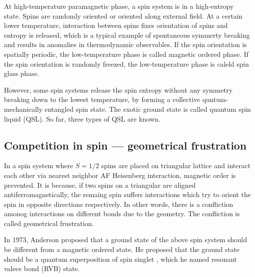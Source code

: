 At high-temperature paramagnetic phase, a spin system is in a high-entropy state.
Spins are randomly oriented or oriented along external field.
At a certain lower temperature, interaction between spins fixes orientation of spins and entropy is released, which is a typical example of spontaneous symmerty breaking and results in anomalies in thermodynamic observables.
If the spin orientation is spatially periodic, the low-temperature phase is called magnetic ordered phase.
If the spin orientation is randomly freezed, the low-temperature phase is caleld spin glass phase.

However, some spin systems release the spin entropy without any symmetry breaking down to the lowest temperature, by forming a collective quntum-mechanically entangled spin state.
The exotic ground state is called quantum spin liquid (QSL).
So far, three types of QSL are known.

\begin{comment}
\subsection{One-dimensional $S = 1/2$ Heisenberg spin chain}

Quantum spin liquid has an unusual elementary excitation called fractional excitation.

The concept of fractional excitaion is wider than quantum spin liquid.
It also appears in itinerant electron system, for example, spin-charge separation in Tomonaga-Luttinger liquid (one-dimensional Hubbard model) and $e/3$ excitation in two-dimensional fractional quantum Hall liquid (Table \textcolor{red}{make table}).
\end{comment}
\subsection{Competition in spin --- geometrical frustration}
In a spin system where $S = 1/2$ spins are placed on triangular lattice and interact each other via nearest neighbor AF Heisenberg interaction, magnetic order is prevented.
It is because, if two spins on a triangular are aligned antiferromagnetically, the remaing spin suffers interactions which try to orient the spin in opposite directions respectively.
In other words, there is a confliction amonog interactions on different bonds due to the geometry.
The confliction is called geometrical frustration.

In 1973, Anderson proposed that a ground state of the above spin system should be different from a magnetic ordered state.
He proposed that the ground state should be a quantum superposition of spin singlet , which he named resonant valece bond (RVB) state.

